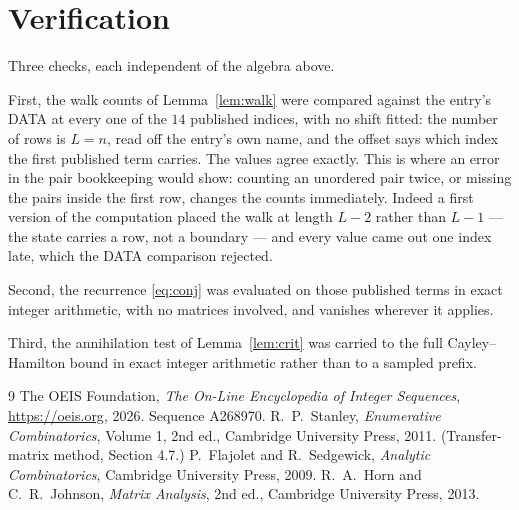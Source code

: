 \documentclass[11pt,a4paper]{article}
\theoremstyle{plain}
\theoremstyle{definition}
\begin{document}
\section{Verification}

Three checks, each independent of the algebra above.

First, the walk counts of Lemma~\ref{lem:walk} were compared against the entry's DATA at
every one of the $14$ published indices, with no shift fitted: the number of rows is
$L=n$, read off the entry's own name, and the offset says which index the first
published term carries. The values agree exactly. This is where an error in the pair
bookkeeping would show: counting an unordered pair twice, or missing the pairs inside the
first row, changes the counts immediately. Indeed a first version of the computation
placed the walk at length $L-2$ rather than $L-1$ --- the state carries a row, not a
boundary --- and every value came out one index late, which the DATA comparison rejected.

Second, the recurrence \eqref{eq:conj} was evaluated on those published terms in exact
integer arithmetic, with no matrices involved, and vanishes wherever it applies.

Third, the annihilation test of Lemma~\ref{lem:crit} was carried to the full
Cayley--Hamilton bound in exact integer arithmetic rather than to a sampled prefix.

\begin{thebibliography}{9}
 The OEIS Foundation, \emph{The On-Line Encyclopedia of Integer
Sequences}, \url{https://oeis.org}, 2026. Sequence A268970.
 R.~P.~Stanley, \emph{Enumerative Combinatorics}, Volume 1, 2nd ed.,
Cambridge University Press, 2011. (Transfer-matrix method, Section 4.7.)
 P.~Flajolet and R.~Sedgewick, \emph{Analytic Combinatorics}, Cambridge
University Press, 2009.
 R.~A.~Horn and C.~R.~Johnson, \emph{Matrix Analysis}, 2nd ed., Cambridge
University Press, 2013.
\end{thebibliography}
\end{document}
